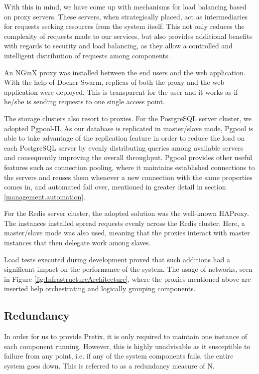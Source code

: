 \documentclass[12pt]{article}
\begin{document}
With this in mind, we have come up with mechanisms for load balancing based on proxy servers.
These servers, when strategically placed, act as intermediaries for requests seeking resources from the system itself.
This not only reduces the complexity of requests made to our services, but also provides additional benefits with regards to security and load balancing,
as they allow a controlled and intelligent distribution of requests among components.

An NGinX proxy was installed between the end users and the web application.
With the help of Docker Swarm, replicas of both the proxy and the web application were deployed.
This is transparent for the user and it works as if he/she is sending requests to one single access point.

The storage clusters also resort to proxies.
For the PostgreSQL server cluster, we adopted Pgpool-II.
As our database is replicated in master/slave mode, Pgpool is able to take advantage of the replication feature in order to reduce the load on each PostgreSQL server
by evenly distributing queries among available servers and consequently improving the overall throughput.
Pgpool provides other useful features such as connection pooling, where it maintains established connections to the servers and reuses them whenever a new
connection with the same properties comes in, and automated fail over, mentioned in greater detail in section \ref{management.automation}.

For the Redis server cluster, the adopted solution was the well-known HAProxy.
The instances installed spread requests evenly across the Redis cluster.
Here, a master/slave mode was also used, meaning that the proxies interact with master instances that then delegate work among slaves.

Load tests executed during development proved that such additions had a significant impact on the performance of the system.
The usage of networks, seen in Figure \ref{fig:InfrastructureArchitecture}, where the proxies mentioned above are inserted help orchestrating and logically
grouping components.

\subsection{Redundancy} \label{architecture.redundancy} %


In order for us to provide Pretix, it is only required to maintain one instance of each component running.
However, this is highly unadvisable as it susceptible to failure from any point, i.e. if any of the system components fails, the entire system goes down.
This is referred to as a redundancy measure of N.
\end{document}
